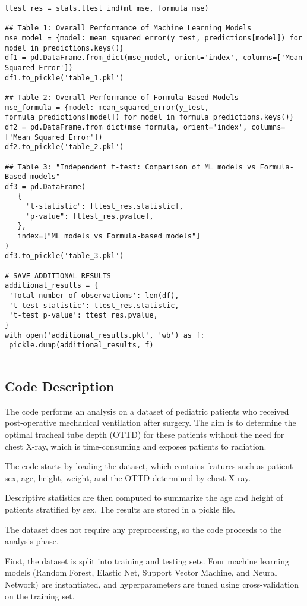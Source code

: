 \documentclass[11pt]{article}
\begin{document}
\begin{verbatim}
ttest_res = stats.ttest_ind(ml_mse, formula_mse)

## Table 1: Overall Performance of Machine Learning Models
mse_model = {model: mean_squared_error(y_test, predictions[model]) for model in predictions.keys()}
df1 = pd.DataFrame.from_dict(mse_model, orient='index', columns=['Mean Squared Error'])
df1.to_pickle('table_1.pkl')

## Table 2: Overall Performance of Formula-Based Models
mse_formula = {model: mean_squared_error(y_test, formula_predictions[model]) for model in formula_predictions.keys()}
df2 = pd.DataFrame.from_dict(mse_formula, orient='index', columns=['Mean Squared Error'])
df2.to_pickle('table_2.pkl')

## Table 3: "Independent t-test: Comparison of ML models vs Formula-Based models"
df3 = pd.DataFrame(
   {
     "t-statistic": [ttest_res.statistic],
     "p-value": [ttest_res.pvalue],
   },
   index=["ML models vs Formula-based models"]
)
df3.to_pickle('table_3.pkl')

# SAVE ADDITIONAL RESULTS
additional_results = {
 'Total number of observations': len(df),
 't-test statistic': ttest_res.statistic,
 't-test p-value': ttest_res.pvalue,
}
with open('additional_results.pkl', 'wb') as f:
 pickle.dump(additional_results, f)
 
\end{verbatim}

\subsection{Code Description}

The code performs an analysis on a dataset of pediatric patients who received post-operative mechanical ventilation after surgery. The aim is to determine the optimal tracheal tube depth (OTTD) for these patients without the need for chest X-ray, which is time-consuming and exposes patients to radiation.

The code starts by loading the dataset, which contains features such as patient sex, age, height, weight, and the OTTD determined by chest X-ray. 

Descriptive statistics are then computed to summarize the age and height of patients stratified by sex. The results are stored in a pickle file.

The dataset does not require any preprocessing, so the code proceeds to the analysis phase.

First, the dataset is split into training and testing sets. Four machine learning models (Random Forest, Elastic Net, Support Vector Machine, and Neural Network) are instantiated, and hyperparameters are tuned using cross-validation on the training set.
\end{document}
